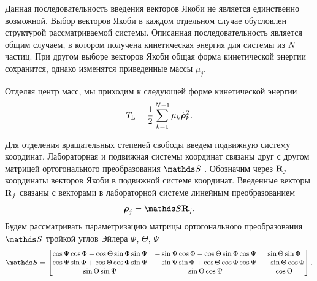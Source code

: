 Данная последовательность введения векторов Якоби не является единственно возможной. Выбор векторов Якоби в каждом отдельном случае обусловлен структурой рассматриваемой системы. Описанная последовательность является общим случаем, в котором получена кинетическая энергия для системы из $N$ частиц. При другом выборе векторов Якоби общая форма кинетической энергии сохранится, однако изменятся приведенные массы $\mu_j$. \par
Отделяя центр масс, мы приходим к следующей форме кинетической энергии
\begin{gather}
    T_\text{L} = \frac{1}{2} \sum_{k = 1}^{N - 1} \mu_k \dot{\boldsymbol{\rho}}_k^2.
\end{gather}

Для отделения вращательных степеней свободы введем подвижную систему координат. Лабораторная и подвижная системы координат связаны друг с другом матрицей ортогонального преобразования $\bbS$ \cite{goldstein}. Обозначим через $\mathbf{R}_j$ координаты векторов Якоби в подвижной системе координат. Введенные векторы $\mathbf{R}_j$ связаны с векторами в лабораторной системе линейным преобразованием
\begin{gather}
    \boldsymbol{\rho}_j = \bbS \mf{R}_j.
\end{gather}
Будем рассматривать параметризацию матрицы ортогонального преобразования $\bbS$ тройкой углов Эйлера $\Phi$, $\Theta$, $\Psi$ \cite{goldstein}
\begin{gather}
    \bbS = 
    \begin{bmatrix}
        \cos \Psi \cos \Phi - \cos \Theta \sin \Phi \sin \Psi & -\sin \Psi \cos \Phi - \cos \Theta \sin \Phi \cos \Psi & \sin \Theta \sin \Phi \\ 
        \cos \Psi \sin \Phi + \cos \Theta \cos \Phi \sin \Psi & -\sin \Psi \sin \Phi + \cos \Theta \cos \Phi \cos \Psi & - \sin \Theta \cos \Phi \\
        \sin \Theta \sin \Psi & \sin \Theta \cos \Psi & \cos \Theta
    \end{bmatrix}.
\end{gather}

